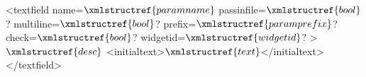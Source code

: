 <textfield name=$\xmlstructref{paramname}$ passinfile=$\xmlstructref{bool}$? multiline=$\xmlstructref{bool}$? prefix=$\xmlstructref{paramprefix}$? 
         check=$\xmlstructref{bool}$? widgetid=$\xmlstructref{widgetid}$? >
  $\xmlstructref{desc}$
  <initialtext>$\xmlstructref{text}$</initialtext>
</textfield>
